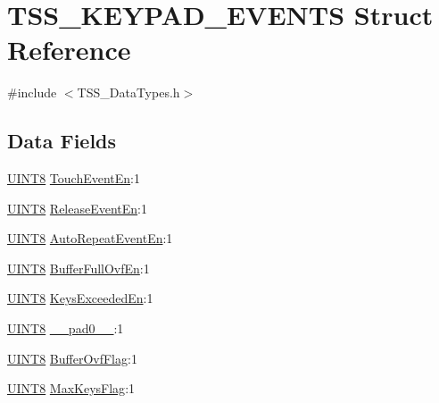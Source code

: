 \hypertarget{struct_t_s_s___k_e_y_p_a_d___e_v_e_n_t_s}{}\section{T\+S\+S\+\_\+\+K\+E\+Y\+P\+A\+D\+\_\+\+E\+V\+E\+N\+TS Struct Reference}
\label{struct_t_s_s___k_e_y_p_a_d___e_v_e_n_t_s}


{\ttfamily \#include $<$T\+S\+S\+\_\+\+Data\+Types.\+h$>$}

\subsection*{Data Fields}
\begin{DoxyCompactItemize}
\item 
\hyperlink{_t_s_s___data_types_8h_ab27e9918b538ce9d8ca692479b375b6a}{U\+I\+N\+T8} \hyperlink{struct_t_s_s___k_e_y_p_a_d___e_v_e_n_t_s_a47e39087ef5b2ade86534ceec26f971a}{Touch\+Event\+En}\+:1
\item 
\hyperlink{_t_s_s___data_types_8h_ab27e9918b538ce9d8ca692479b375b6a}{U\+I\+N\+T8} \hyperlink{struct_t_s_s___k_e_y_p_a_d___e_v_e_n_t_s_aa309d36e15c0535dc640a38541b6f115}{Release\+Event\+En}\+:1
\item 
\hyperlink{_t_s_s___data_types_8h_ab27e9918b538ce9d8ca692479b375b6a}{U\+I\+N\+T8} \hyperlink{struct_t_s_s___k_e_y_p_a_d___e_v_e_n_t_s_aecb55a80696d857e8a49f48d9fbb03da}{Auto\+Repeat\+Event\+En}\+:1
\item 
\hyperlink{_t_s_s___data_types_8h_ab27e9918b538ce9d8ca692479b375b6a}{U\+I\+N\+T8} \hyperlink{struct_t_s_s___k_e_y_p_a_d___e_v_e_n_t_s_adaf8db1b35cf5fdbe57eb4f8c2092d12}{Buffer\+Full\+Ovf\+En}\+:1
\item 
\hyperlink{_t_s_s___data_types_8h_ab27e9918b538ce9d8ca692479b375b6a}{U\+I\+N\+T8} \hyperlink{struct_t_s_s___k_e_y_p_a_d___e_v_e_n_t_s_a04e5de609fa52c86071f50267f95d425}{Keys\+Exceeded\+En}\+:1
\item 
\hyperlink{_t_s_s___data_types_8h_ab27e9918b538ce9d8ca692479b375b6a}{U\+I\+N\+T8} \hyperlink{struct_t_s_s___k_e_y_p_a_d___e_v_e_n_t_s_a2ee36fe5d196fb00b71d0929ff19fe04}{\+\_\+\+\_\+pad0\+\_\+\+\_\+}\+:1
\item 
\hyperlink{_t_s_s___data_types_8h_ab27e9918b538ce9d8ca692479b375b6a}{U\+I\+N\+T8} \hyperlink{struct_t_s_s___k_e_y_p_a_d___e_v_e_n_t_s_ab1c395373e49b8462dc3364deb1d99a6}{Buffer\+Ovf\+Flag}\+:1
\item 
\hyperlink{_t_s_s___data_types_8h_ab27e9918b538ce9d8ca692479b375b6a}{U\+I\+N\+T8} \hyperlink{struct_t_s_s___k_e_y_p_a_d___e_v_e_n_t_s_a8e5734ea22148ea5a126faa325632ec4}{Max\+Keys\+Flag}\+:1
\end{DoxyCompactItemize}


